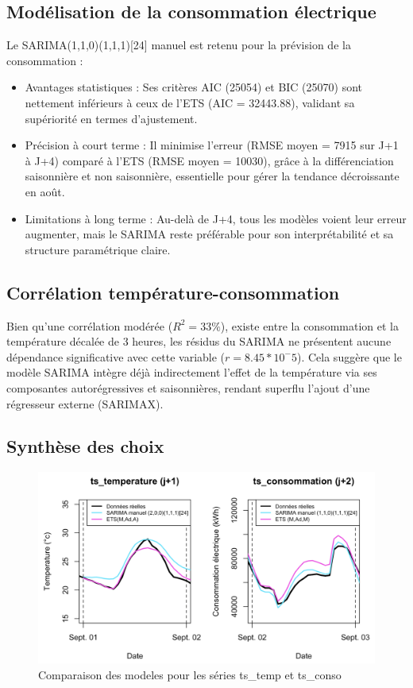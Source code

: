 \documentclass{article}
\theoremstyle{definition}
\theoremstyle{remark}
\begin{document}
\subsection*{Modélisation de la consommation électrique}
Le SARIMA(1,1,0)(1,1,1)[24] manuel est retenu pour la prévision de la consommation :
\begin{itemize}
    \item Avantages statistiques : Ses critères AIC (25054) et BIC (25070) sont nettement inférieurs à ceux de l'ETS (AIC = 32443.88), validant sa supériorité en termes d'ajustement.
    \item Précision à court terme : Il minimise l'erreur (RMSE moyen = 7915 sur J+1 à J+4) comparé à l'ETS (RMSE moyen = 10030), grâce à la différenciation saisonnière et non saisonnière, essentielle pour gérer la tendance décroissante en août.
    \item Limitations à long terme : Au-delà de J+4, tous les modèles voient leur erreur augmenter, mais le SARIMA reste préférable pour son interprétabilité et sa structure paramétrique claire.
\end{itemize}
\subsection*{Corrélation température-consommation}
Bien qu'une corrélation modérée ($R^2 = 33\%$), existe entre la consommation et la température décalée de 3 heures, les résidus du SARIMA ne présentent aucune dépendance significative avec cette variable ($r = 8.45*10^-5$). Cela suggère que le modèle SARIMA intègre déjà indirectement l'effet de la température via ses composantes autorégressives et saisonnières, rendant superflu l'ajout d'une régresseur externe (SARIMAX).
\subsection*{Synthèse des choix}
\FloatBarrier
\begin{figure}[!h]
    \centering
    \includegraphics[width=0.8\linewidth]{concl.png}
    \caption{\centering Comparaison des modeles pour les séries ts\_temp et ts\_conso}
    \label{fig:enter-label}
\end{figure}
\end{document}
